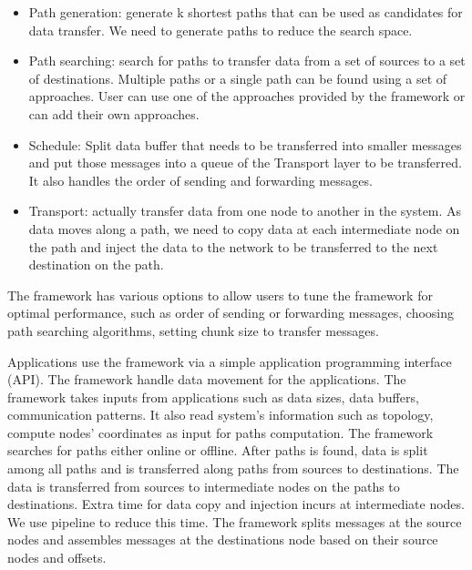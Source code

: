 \begin{itemize}
\item Path generation: generate k shortest paths that can be used as candidates for data transfer. We need to generate paths to reduce the search space.
\item Path searching: search for paths to transfer data from a set of sources to a set of destinations. Multiple paths or a single path can be found using a set of approaches. User can use one of the approaches provided by the framework or can add their own approaches.
\item Schedule: Split data buffer that needs to be transferred into smaller messages and put those messages into a queue of the Transport layer to be transferred. It also handles the order of sending and forwarding messages.
\item Transport: actually transfer data from one node to another in the system. As data moves along a path, we need to copy data at each intermediate node on the path and inject the data to the network to be transferred to the next destination on the path.
\end{itemize}
The framework has various options to allow users to tune the framework for optimal performance, such as order of sending or forwarding messages, choosing path searching algorithms, setting chunk size to transfer messages. 

Applications use the framework via a simple application programming interface (API). The framework handle data movement for the applications. The framework takes inputs from applications such as data sizes, data buffers, communication patterns. It also read system's information such as topology, compute nodes' coordinates as input for paths computation. The framework searches for paths either online or offline. After paths is found, data is split among all paths and is transferred along paths from sources to destinations. The data is transferred from sources to intermediate nodes on the paths to destinations. Extra time for data copy and injection incurs at intermediate nodes. We use pipeline to reduce this time. The framework splits messages at the source nodes and assembles messages at the destinations node based on their source nodes and offsets.
